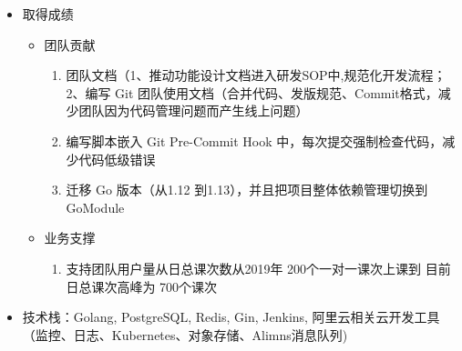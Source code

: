 \documentclass{resume}
\begin{document}
\begin{itemize}
  \item 取得成绩
  \begin{itemize}
    \item 团队贡献
    \begin{enumerate}
      \item 团队文档（1、推动功能设计文档进入研发SOP中,规范化开发流程； 2、编写 Git 团队使用文档（合并代码、发版规范、Commit格式，减少团队因为代码管理问题而产生线上问题）
      \item 编写脚本嵌入 Git Pre-Commit Hook 中，每次提交强制检查代码，减少代码低级错误
      \item 迁移 Go 版本（从1.12 到1.13），并且把项目整体依赖管理切换到 GoModule
    \end{enumerate}
    \item 业务支撑
    \begin{enumerate}
      \item 支持团队用户量从日总课次数从2019年 200个一对一课次上课到 目前日总课次高峰为 700个课次 
    \end{enumerate}
  \end{itemize}
  \item 技术栈：Golang, PostgreSQL, Redis, Gin, Jenkins, 阿里云相关云开发工具（监控、日志、Kubernetes、对象存储、Alimns消息队列)
\end{itemize}
\end{document}
